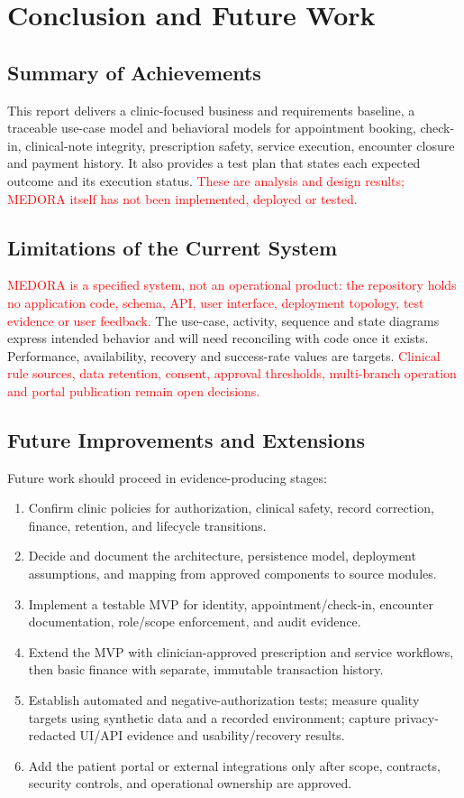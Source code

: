 \documentclass[a4paper,12pt]{article}
\newcommand{\weak}[1]{\textcolor{red}{#1}}
\begin{document}
\section{Conclusion and Future Work}

\subsection{Summary of Achievements}
This report delivers a clinic-focused business and requirements baseline, a traceable use-case model and behavioral models for appointment booking, check-in, clinical-note integrity, prescription safety, service execution, encounter closure and payment history. It also provides a test plan that states each expected outcome and its execution status. \weak{These are analysis and design results; MEDORA itself has not been implemented, deployed or tested.}

\subsection{Limitations of the Current System}
\weak{MEDORA is a specified system, not an operational product: the repository holds no application code, schema, API, user interface, deployment topology, test evidence or user feedback.} The use-case, activity, sequence and state diagrams express intended behavior and will need reconciling with code once it exists. Performance, availability, recovery and success-rate values are targets. \weak{Clinical rule sources, data retention, consent, approval thresholds, multi-branch operation and portal publication remain open decisions.}

\subsection{Future Improvements and Extensions}
Future work should proceed in evidence-producing stages:
\begin{enumerate}[leftmargin=1.6em]
    \item Confirm clinic policies for authorization, clinical safety, record correction, finance, retention, and lifecycle transitions.
    \item Decide and document the architecture, persistence model, deployment assumptions, and mapping from approved components to source modules.
    \item Implement a testable MVP for identity, appointment/check-in, encounter documentation, role/scope enforcement, and audit evidence.
    \item Extend the MVP with clinician-approved prescription and service workflows, then basic finance with separate, immutable transaction history.
    \item Establish automated and negative-authorization tests; measure quality targets using synthetic data and a recorded environment; capture privacy-redacted UI/API evidence and usability/recovery results.
    \item Add the patient portal or external integrations only after scope, contracts, security controls, and operational ownership are approved.
\end{enumerate}
\end{document}
